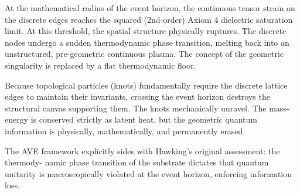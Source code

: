 At the mathematical radius of the event horizon, the continuous tensor strain on
the discrete edges reaches the squared (2nd-order) Axiom 4 dielectric saturation limit. At this
threshold, the spatial structure physically ruptures. The discrete nodes undergo a sudden
thermodynamic phase transition, melting back into an unstructured, pre-geometric continuous
plasma. The concept of the geometric singularity is replaced by a flat thermodynamic floor.

Because topological particles (knots) fundamentally require the discrete lattice edges to
maintain their invariants, crossing the event horizon destroys the structural canvas supporting
them. The knots mechanically unravel. The mass-energy is conserved strictly as latent heat,
but the geometric quantum information is physically, mathematically, and permanently erased.

The AVE framework explicitly sides with Hawking's original assessment: the thermody-
namic phase transition of the substrate dictates that quantum unitarity is macroscopically
violated at the event horizon, enforcing information loss.